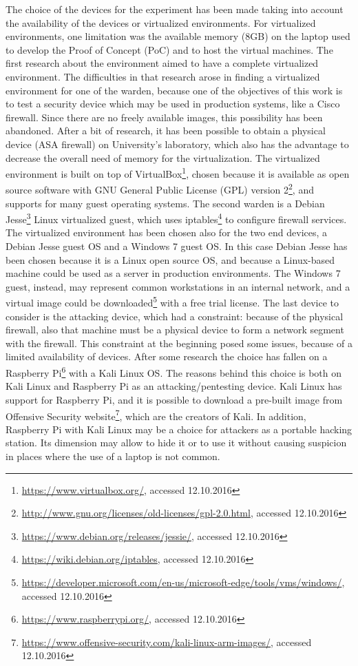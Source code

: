 \documentclass[12pt]{article}
\begin{document}
The choice of the devices for the experiment has been made taking into account the availability of the devices or virtualized environments. For virtualized environments, one limitation was the available memory (8GB) on the laptop used to develop the Proof of Concept (PoC) and to host the virtual machines. The first research about the environment aimed to have a complete virtualized environment. The difficulties in that research arose in finding a virtualized environment for one of the warden, because one of the objectives of this work is to test a security device which may be used in production systems, like a Cisco firewall. Since there are no freely available images, this possibility has been abandoned. After a bit of research, it has been possible to obtain a physical device (ASA firewall) on University's laboratory, which also has the advantage to decrease the overall need of memory for the virtualization. The virtualized environment is built on top of VirtualBox\footnote{\url{https://www.virtualbox.org/}, accessed 12.10.2016}, chosen because it is available as open source software with GNU General Public License (GPL) version 2\footnote{\url{http://www.gnu.org/licenses/old-licenses/gpl-2.0.html}, accessed 12.10.2016}, and supports for many guest operating systems. The second warden is a Debian Jesse\footnote{\url{https://www.debian.org/releases/jessie/}, accessed 12.10.2016} Linux virtualized guest, which uses iptables\footnote{\url{https://wiki.debian.org/iptables}, accessed 12.10.2016} to configure firewall services. The virtualized environment has been chosen also for the two end devices, a Debian Jesse guest OS and a Windows 7 guest OS. In this case Debian Jesse has been chosen because it is a Linux open source OS, and because a Linux-based machine could be used as a server in production environments. The Windows 7 guest, instead, may represent common workstations in an internal network, and a virtual image could be downloaded\footnote{\url{https://developer.microsoft.com/en-us/microsoft-edge/tools/vms/windows/}, accessed 12.10.2016} with a free trial license. The last device to consider is the attacking device, which had a constraint: because of the physical firewall, also that machine must be a physical device to form a network segment with the firewall. This constraint at the beginning posed some issues, because of a limited availability of devices. After some research the choice has fallen on a Raspberry Pi\footnote{\url{https://www.raspberrypi.org/}, accessed 12.10.2016} with a Kali Linux OS. The reasons behind this choice is both on Kali Linux and Raspberry Pi as an attacking/pentesting device. Kali Linux has support for Raspberry Pi, and it is possible to download a pre-built image from Offensive Security website\footnote{\url{https://www.offensive-security.com/kali-linux-arm-images/}, accessed 12.10.2016}, which are the creators of Kali. In addition, Raspberry Pi with Kali Linux may be a choice for attackers as a portable hacking station. Its dimension may allow to hide it or to use it without causing suspicion in places where the use of a laptop is not common.
\end{document}

